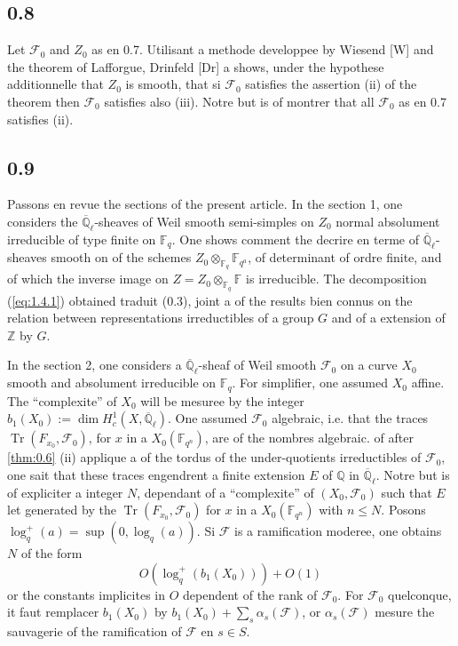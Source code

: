 \documentclass[11pt,a4paper]{article}
\theoremstyle{plain}
\theoremstyle{definition}
\DeclareMathOperator{\tr}{Tr}
\begin{document}
\subsection*{0.8}

Let $\mathcal{F}_0$ and $Z_0$ as en 0.7. Utilisant a methode developpee by Wiesend [W] and the theorem of Lafforgue, Drinfeld [Dr] a shows, under the hypothese additionnelle that $Z_0$ is smooth, that si $\mathcal{F}_0$ satisfies the assertion (ii) of the theorem then $\mathcal{F}_0$ satisfies also (iii). Notre but is of montrer that all $\mathcal{F}_0$ as en 0.7 satisfies (ii).

\subsection*{0.9}

Passons en revue the sections of the present article. In the section 1, one considers the $\overline{\mathbb{Q}}_\ell$-sheaves of Weil smooth semi-simples on $Z_0$ normal absolument irreducible of type finite on $\mathbb{F}_q$. One shows comment the decrire en terme of $\overline{\mathbb{Q}}_\ell$-sheaves smooth on of the schemes $Z_0 \otimes_{\mathbb{F}_q} \mathbb{F}_{q^a}$, of determinant of ordre finite, and of which the inverse image on $Z = Z_0 \otimes_{\mathbb{F}_q} \mathbb{F}$ is irreducible. The decomposition (\ref{eq:1.4.1}) obtained traduit (0.3), joint a of the results bien connus on the relation between representations irreductibles of a group $G$ and of a extension of $\mathbb{Z}$ by $G$.

In the section 2, one considers a $\overline{\mathbb{Q}}_\ell$-sheaf of Weil smooth $\mathcal{F}_0$ on a curve $X_0$ smooth and absolument irreducible on $\mathbb{F}_q$. For simplifier, one assumed $X_0$ affine. The ``complexite'' of $X_0$ will be mesuree by the integer $b_1(X_0) := \dim H_c^1(X, \overline{\mathbb{Q}}_\ell)$. One assumed $\mathcal{F}_0$ algebraic, i.e. that the traces $\tr(F_{x_0},\mathcal{F}_0)$, for $x$ in a $X_0(\mathbb{F}_{q^n})$, are of the nombres algebraic. of after \ref{thm:0.6} (ii) applique a of the tordus of the under-quotients irreductibles of $\mathcal{F}_0$, one sait that these traces engendrent a finite extension $E$ of $\mathbb{Q}$ in $\overline{\mathbb{Q}}_\ell$. Notre but is of expliciter a integer $N$, dependant of a ``complexite'' of $(X_0,\mathcal{F}_0)$ such that $E$ let generated by the $\tr(F_{x_0},\mathcal{F}_0)$ for $x$ in a $X_0(\mathbb{F}_{q^n})$ with $n \leq N$. Posons $\log_q^+(a) = \sup(0, \log_q(a))$. Si $\mathcal{F}$ is a ramification moderee, one obtains $N$ of the form
\begin{equation}\label{eq:0.9.1}
O(\log_q^+(b_1(X_0))) + O(1)
\end{equation}
or the constants implicites in $O$ dependent of the rank of $\mathcal{F}_0$. For $\mathcal{F}_0$ quelconque, it faut remplacer $b_1(X_0)$ by $b_1(X_0) + \sum_s \alpha_s(\mathcal{F})$, or $\alpha_s(\mathcal{F})$ mesure the sauvagerie of the ramification of $\mathcal{F}$ en $s \in S$.
\end{document}
